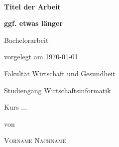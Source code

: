 \newcommand{\typMeinerArbeit}{Bachelorarbeit} 

\newcommand{\themaMeinerArbeit}{Mein Titel}

\newcommand{\meinName}{Vorname Nachname}

\thispagestyle{empty}

\begin{spacing}{1}
\begin{center}	
~\vspace{0mm}

{\sffamily
\LARGE  
\textbf{Titel der Arbeit}

\bigskip
\textbf{ggf. etwas länger}
}


\vspace{15mm}

{\Large \typMeinerArbeit}

\vspace{1cm}

vorgelegt am \today 

\vspace{15mm}

Fakultät Wirtschaft und Gesundheit
\medskip

Studiengang Wirtschaftsinformatik
\medskip

Kurs ... 

\vspace{10mm}

von

\vspace{10mm}

{\large\textsc{\meinName}}

\vspace{10mm}
\end{center}

\vfill


\end{spacing}
